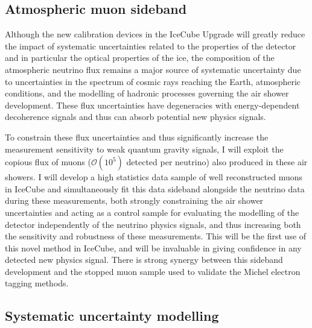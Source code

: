 \documentclass[a4paper,11pt]{article}
\begin{document}
\subsection{Atmospheric muon sideband}

Although the new calibration devices in the IceCube Upgrade will greatly reduce the impact of systematic uncertainties related to the properties of the detector and in particular the optical properties of the ice, the composition of the atmospheric neutrino flux remains a major source of systematic uncertainty due to uncertainties in the spectrum of cosmic rays reaching the Earth, atmospheric conditions, and the modelling of hadronic processes governing the air shower development. These flux uncertainties have degeneracies with energy-dependent decoherence signals and thus can absorb potential new physics signals.

To constrain these flux uncertainties and thus significantly increase the measurement sensitivity to weak quantum gravity signals, I will exploit the copious flux of muons ($\mathcal{O}(10^5)$ detected per neutrino) also produced in these air showers. I will develop a high statistics data sample of well reconstructed muons in IceCube and simultaneously fit this data sideband alongside the neutrino data during these measurements, both strongly constraining the air shower uncertainties and acting as a control sample for evaluating the modelling of the detector independently of the neutrino physics signals, and thus increasing both the sensitivity and robustness of these measurements. This will be the first use of this novel method in IceCube, and will be invaluable in giving confidence in any detected new physics signal. There is strong synergy between this sideband development and the stopped muon sample used to validate the Michel electron tagging methods.  \\




\subsection{Systematic uncertainty modelling}
\end{document}
